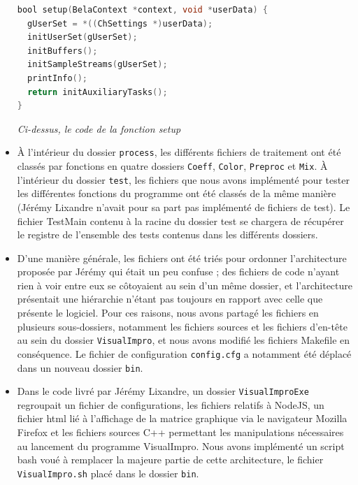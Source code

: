 \begin{itemize}
       \begin{lstlisting}[language=C, frame=single, breaklines=true]
bool setup(BelaContext *context, void *userData) {
  gUserSet = *((ChSettings *)userData);
  initUserSet(gUserSet);
  initBuffers();
  initSampleStreams(gUserSet);
  printInfo();
  return initAuxiliaryTasks();
}
 \end{lstlisting}
 
 \begin{center}
  \textit{Ci-dessus, le code de la fonction setup}
 \end{center}
 
 \item \`{A} l'intérieur du dossier \verb!process!, les
       différents fichiers de traitement ont été classés par
       fonctions en quatre dossiers \verb!Coeff!, \verb!Color!,
       \verb!Preproc! et \verb!Mix!. \`{A} l'intérieur du dossier
       \verb!test!, les fichiers que nous avons implémenté pour tester les
       différentes fonctions du programme ont été classés de la même
       manière (Jérémy Lixandre n'avait pour sa part pas implémenté
       de fichiers de test). Le fichier TestMain contenu à la racine du
       dossier test se chargera de récupérer le registre de l'ensemble
       des tests contenus dans les différents dossiers.
       
 \item D'une manière générale, les fichiers ont été triés pour
       ordonner l'architecture proposée par Jérémy qui était un peu
       confuse ; des fichiers de code n'ayant rien à voir entre eux
       se côtoyaient au sein d'un même dossier, et l'architecture
       présentait une hiérarchie n'étant pas toujours en rapport
       avec celle que présente le logiciel. Pour ces raisons, nous
       avons partagé les fichiers en plusieurs sous-dossiers,
       notamment les fichiers sources et les fichiers d'en-tête au
       sein du dossier \verb!VisualImpro!, et nous avons modifié
       les fichiers Makefile en conséquence. Le fichier de
       configuration \verb!config.cfg! a notamment été déplacé dans
       un nouveau dossier \verb!bin!.
       
 \item Dans le code livré par Jérémy Lixandre, un dossier
       \verb!VisualImproExe! regroupait un fichier de
       configurations, les fichiers relatifs à NodeJS, un fichier
       html lié à l'affichage de la matrice graphique via le
       navigateur Mozilla Firefox et les fichiers sources C++
       permettant les manipulations nécessaires au lancement du
       programme VisualImpro. Nous avons implémenté un script
       bash voué à remplacer la majeure partie de cette
       architecture, le fichier \verb!VisualImpro.sh! placé dans
       le dossier \verb!bin!.
\end{itemize}
